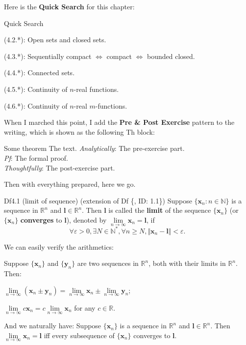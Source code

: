 \documentclass{article}
\begin{document}
Here is the \textbf{Quick Search} for this chapter:
\begin{Th}{Quick Search}
    \begin{compactdesc}
        \item (4.2.*): Open sets and closed sets.
        \item (4.3.*): Sequentially compact $\Leftrightarrow$ compact $\Leftrightarrow$ bounded closed.
        \item (4.4.*): Connected sets.
        \item (4.5.*): Continuity of $n$-real functions.
        \item (4.6.*): Continuity of $n$-real $m$-functions.
    \end{compactdesc}
\end{Th}

When I marched this point, I add the \textbf{Pre \& Post Exercise} pattern to the writing, which is shown as the following Th block:

\begin{Th}{Some theorem}
    The text.
    \tcblower
    \textcolor{P}{\textit{Analytically}: The pre-exercise part.}\\
    \textit{Pf}: The formal proof.\\
    \textcolor{P}{\textit{Thoughtfully}: The post-exercise part.}
\end{Th}

Then with everything prepared, here we go.

\begin{Df}{Df4.1 (limit of sequence) (extension of Df \{, ID: 1.1\})}
    Suppose $\{\pmb{x}_n: n\in\mathbb{N}\}$ is a sequence in $\mathbb{R}^n$ and $\pmb{l}\in\mathbb{R}^n$. Then $\pmb{l}$ is called the \textbf{limit} of the sequence $\{\pmb{x}_n\}$ (or $\{\pmb{x}_n\}$ \textbf{converges} to $\pmb{l}$), denoted by $\lim\limits_{n\to\infty} \pmb{x}_n = \pmb{l}$, if
    $$\forall \varepsilon > 0, \exists N\in\mathbb{N}^\ast, \forall n\geq N, \Vert \pmb{x}_n - \pmb{l}\Vert < \varepsilon.$$
\end{Df}

\begin{Rmk}{}
    We can easily verify the arithmetics:
    \textcolor{Th}{Suppose $\{\pmb{x}_n\}$ and $\{\pmb{y}_n\}$ are two sequences in $\mathbb{R}^n$, both with their limits in $\mathbb{R}^n$. Then:
    \begin{compactenum}
        \item $\lim\limits_{n\to\infty} (\pmb{x}_n\pm\pmb{y}_n) = \lim\limits_{n\to\infty} \pmb{x}_n \pm \lim\limits_{n\to\infty} \pmb{y}_n$;
        \item $\lim\limits_{n\to\infty} c\pmb{x}_n = c\lim\limits_{n\to\infty} \pmb{x}_n$ for any $c\in\mathbb{R}$.
    \end{compactenum}}
    And we naturally have:
    \textcolor{Th}{Suppose $\{\pmb{x}_n\}$ is a sequence in $\mathbb{R}^n$ and $\pmb{l}\in\mathbb{R}^n$. Then $\lim\limits_{n\to\infty} \pmb{x}_n = \pmb{l}$ iff every subsequence of $\{\pmb{x}_n\}$ converges to $\pmb{l}$.}
\end{Rmk}
\end{document}
